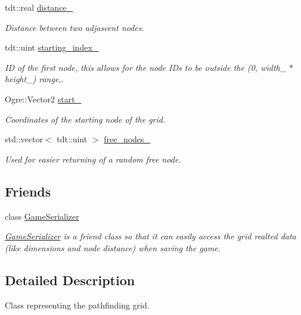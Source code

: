 \begin{DoxyCompactItemize}
\item 
tdt\+::real \hyperlink{class_grid_aae31e3784132226a6ecc36c34065b342}{distance\+\_\+}
\begin{DoxyCompactList}\small\item\em Distance between two adjascent nodes. \end{DoxyCompactList}\item 
tdt\+::uint \hyperlink{class_grid_adf871683c5c3e983ba1dc7ddf2a45c4e}{starting\+\_\+index\+\_\+}
\begin{DoxyCompactList}\small\item\em ID of the first node, this allows for the node I\+Ds to be outside the (0, width\+\_\+ $\ast$ height\+\_\+) range,. \end{DoxyCompactList}\item 
Ogre\+::\+Vector2 \hyperlink{class_grid_aedee2f3e6f46e677b462c8301572e894}{start\+\_\+}
\begin{DoxyCompactList}\small\item\em Coordinates of the starting node of the grid. \end{DoxyCompactList}\item 
std\+::vector$<$ tdt\+::uint $>$ \hyperlink{class_grid_aea5fa0d96189839d5d8cbceabcdba132}{free\+\_\+nodes\+\_\+}
\begin{DoxyCompactList}\small\item\em Used for easier returning of a random free node. \end{DoxyCompactList}\end{DoxyCompactItemize}
\subsection*{Friends}
\begin{DoxyCompactItemize}
\item 
class \hyperlink{class_grid_a6f4a2258d01e962995f3a4743b711864}{Game\+Serializer}
\begin{DoxyCompactList}\small\item\em \hyperlink{class_game_serializer}{Game\+Serializer} is a friend class so that it can easily access the grid realted data (like dimensions and node distance) when saving the game. \end{DoxyCompactList}\end{DoxyCompactItemize}


\subsection{Detailed Description}
Class representing the pathfinding grid. 

